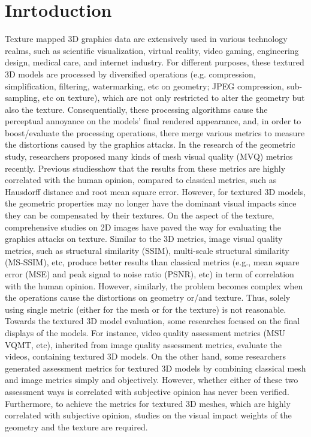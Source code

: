 \section{Inrtoduction}
Texture mapped 3D graphics data are extensively used in various technology realms, such as scientific visualization, virtual reality, video gaming, engineering design, medical care, and internet industry. For different purposes, these textured 3D models are processed by diversified operations (e.g. compression, simplification, filtering, watermarking, etc on geometry; JPEG compression, sub-sampling, etc on texture), which are not only restricted to alter the geometry but also the texture. Consequentially, these processing algorithms cause the perceptual annoyance on the models’ final rendered appearance, and, in order to boost/evaluate the processing operations, there merge various metrics to measure the distortions caused by the graphics attacks. In the research of the geometric study, researchers\cite{Lavou__2011}\cite{V_a_2012}\cite{Wang_2011} proposed many kinds of mesh visual quality (MVQ) metrics recently. Previous studies\cite{Corsini_2013}\cite{Guo_2015}show that the results from these metrics are highly correlated with the human opinion, compared to classical metrics, such as Hausdorff distance and root mean square error. However, for textured 3D models, the geometric properties may no longer have the dominant visual impacts since they can be compensated by their textures.  On the aspect of the texture, comprehensive studies on 2D images have paved the way for evaluating the graphics attacks on texture.  Similar to the 3D metrics, image visual quality metrics, such as structural similarity (SSIM)\cite{Wang_2004}, multi-scale structural similarity (MS-SSIM)\cite{Zhou_Wang_2011}, etc, produce better results than classical metrics (e.g., mean square error (MSE) and peak signal to noise ratio (PSNR), etc) in term of correlation with the human opinion. However, similarly, the problem becomes complex when the operations cause the distortions on geometry or/and texture. Thus, solely using single metric (either for the mesh or for the texture) is not reasonable. Towards the textured 3D model evaluation, some researches focused on the final displays of the models. For instance, video quality assessment metrics (MSU VQMT, etc), inherited from image quality assessment metrics\cite{Wang_2006}, evaluate the videos, containing textured 3D models.  On the other hand, some researchers\cite{Tian_2004} generated assessment metrics for textured 3D models by combining classical mesh and image metrics simply and objectively. However, whether either of these two assessment ways is correlated with subjective opinion has never been verified. Furthermore, to achieve the metrics for textured 3D meshes, which are highly correlated with subjective opinion, studies on the visual impact weights of the geometry and the texture are required.\\
